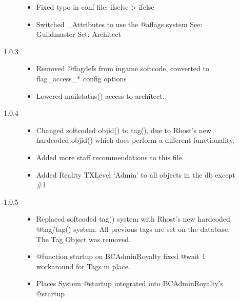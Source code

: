 \documentclass[letterpaper,10pt,english]{sphinxmanual}
\begin{document}
\begin{description}
\begin{description}
\begin{itemize}
\item {} 
\sphinxAtStartPar
Fixed typo in conf file: ifselse \sphinxhyphen{}\textgreater{} ifelse

\item {} 
\sphinxAtStartPar
Switched \_Attributes to use the @aflags system
See: Guildmaster
Set: Architect

\end{itemize}

\item[{1.0.3}] \leavevmode\begin{itemize}
\item {} 
\sphinxAtStartPar
Removed @flagdefs from in\sphinxhyphen{}game softcode, converted to flag\_access\_*
config options

\item {} 
\sphinxAtStartPar
Lowered mailstatus() access to architect.

\end{itemize}

\item[{1.0.4}] \leavevmode\begin{itemize}
\item {} 
\sphinxAtStartPar
Changed softcoded objid() to tag(), due to Rhost’s new hardcoded
objid() which does perform a different functionality.

\item {} 
\sphinxAtStartPar
Added more staff recommendations to this file.

\item {} 
\sphinxAtStartPar
Added Reality TXLevel ‘Admin’ to all objects in the db except \#1

\end{itemize}

\item[{1.0.5}] \leavevmode\begin{itemize}
\item {} 
\sphinxAtStartPar
Replaced softcoded tag() system with Rhost’s new hardcoded @tag/tag()
system. All previous tags are set on the database. The Tag Object
was removed.

\item {} 
\sphinxAtStartPar
@function startup on BC\sphinxhyphen{}Admin\sphinxhyphen{}Royalty fixed \sphinxhyphen{} @wait 1 workaround for
Tags in place.

\item {} 
\sphinxAtStartPar
Places System @startup integrated into BC\sphinxhyphen{}Admin\sphinxhyphen{}Royalty’s @startup


\end{itemize}
\end{description}
\end{description}
\end{document}
